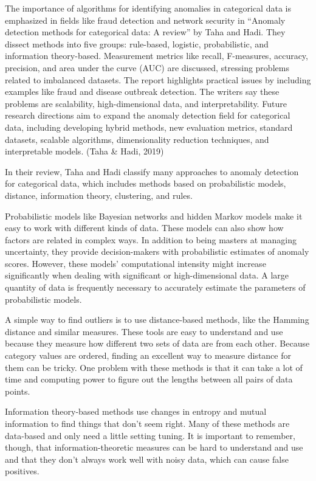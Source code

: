 \documentclass[print]{nuthesis}
\begin{document}
The importance of algorithms for identifying anomalies in categorical data is emphasized in fields like fraud detection and network security in ``Anomaly detection methods for categorical data: A review'' by Taha and Hadi.
They dissect methods into five groups: rule-based, logistic, probabilistic, and information theory-based.
Measurement metrics like recall, F-measures, accuracy, precision, and area under the curve (AUC) are discussed, stressing problems related to imbalanced datasets.
The report highlights practical issues by including examples like fraud and disease outbreak detection.
The writers say these problems are scalability, high-dimensional data, and interpretability.
Future research directions aim to expand the anomaly detection field for categorical data, including developing hybrid methods, new evaluation metrics, standard datasets, scalable algorithms, dimensionality reduction techniques, and interpretable models. (Taha \& Hadi, 2019)

In their review, Taha and Hadi classify many approaches to anomaly detection for categorical data, which includes methods based on probabilistic models, distance, information theory, clustering, and rules.

Probabilistic models like Bayesian networks and hidden Markov models make it easy to work with different kinds of data.
These models can also show how factors are related in complex ways. In addition to being masters at managing uncertainty, they provide decision-makers with probabilistic estimates of anomaly scores.
However, these models' computational intensity might increase significantly when dealing with significant or high-dimensional data.
A large quantity of data is frequently necessary to accurately estimate the parameters of probabilistic models.

A simple way to find outliers is to use distance-based methods, like the Hamming distance and similar measures.
These tools are easy to understand and use because they measure how different two sets of data are from each other.
Because category values are ordered, finding an excellent way to measure distance for them can be tricky.
One problem with these methods is that it can take a lot of time and computing power to figure out the lengths between all pairs of data points.

Information theory-based methods use changes in entropy and mutual information to find things that don't seem right.
Many of these methods are data-based and only need a little setting tuning.
It is important to remember, though, that information-theoretic measures can be hard to understand and use and that they don't always work well with noisy data, which can cause false positives.
\end{document}
